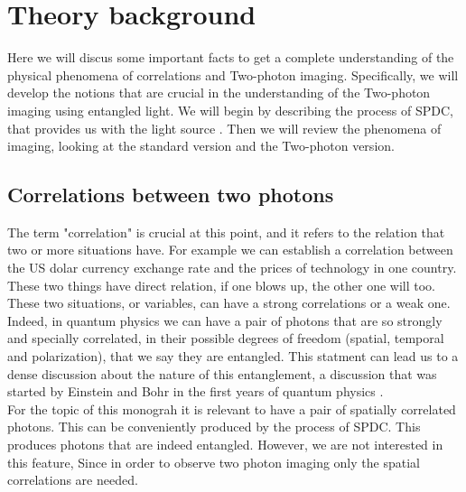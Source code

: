 
\chapter{Theory background} %

\label{Chapter2} %

Here we will discus some important facts to get a complete understanding 
of the physical phenomena of correlations and Two-photon imaging. Specifically, we will develop the 
notions that are crucial in the understanding of the Two-photon imaging using entangled light. We will begin by
 describing the process of SPDC, that provides us with the light source . Then we will review the 
phenomena of imaging, looking at the standard version and the Two-photon version. 

\section{Correlations between two photons}

The term "correlation" is crucial at this point, and it refers to the relation that two or more situations have. For example 
we can establish a correlation between the US dolar currency exchange rate and the prices of technology in one country. These two things have direct relation, if one blows up, the other one will too.
These two situations, or variables, can have a strong correlations or a weak one. \\

Indeed, in quantum physics we can have a pair of photons that are so strongly and specially correlated, in their possible degrees of freedom (spatial, temporal and polarization),
that we say they are entangled. This statment can lead us 
to a dense discussion about the nature of this entanglement, 
a discussion that was started by Einstein and Bohr in the first years of quantum physics \cite{einstein}.\\

For the topic  of this monograh it is relevant to have a pair of spatially correlated  photons. This can be conveniently produced
 by the process of SPDC. This produces photons that are indeed entangled. However, we are not interested in this feature, Since in order to observe 
 two photon imaging only the spatial correlations are needed.



